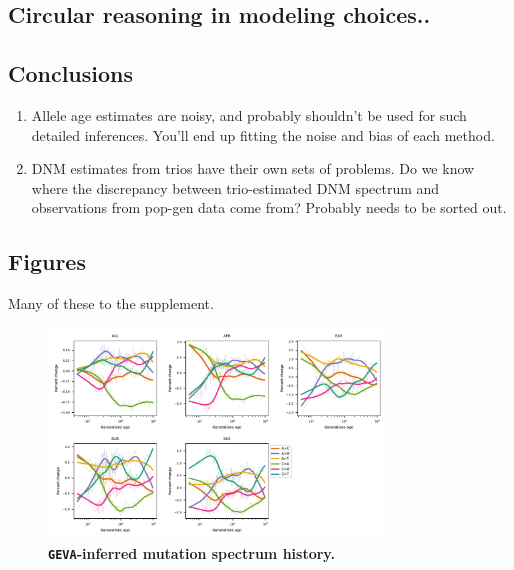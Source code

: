 \documentclass[]{article}
\begin{document}
\subsection*{Circular reasoning in modeling choices..}

\subsection*{Conclusions}

\begin{enumerate}
    \item Allele age estimates are noisy, and probably shouldn't be used
        for such detailed inferences. You'll end up fitting the noise and
        bias of each method.
    \item DNM estimates from trios have their own sets of problems. Do we
        know where the discrepancy between trio-estimated DNM spectrum and
        observations from pop-gen data come from? Probably needs to be
        sorted out.
\end{enumerate}

\break

\subsection*{Figures}

Many of these to the supplement.

\begin{figure}[ht!]
    \centering
    \includegraphics[width=0.8\textwidth]{../plots/spectrum_history.geva.max_age.10000.pdf}
    \caption{
        \textbf{\texttt{GEVA}-inferred mutation spectrum history.}
    }
    \label{fig:geva-spectra}
\end{figure}
\end{document}
